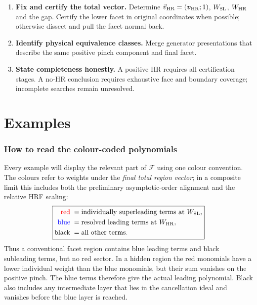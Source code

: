 \documentclass[a4paper,11pt]{article}
\newcommand{\HR}{\mathrm{HR}}
\newcommand{\WSL}{W_{\rm SL}}
\newcommand{\WHR}{W_{\rm HR}}
\newcommand{\vHR}{\vec v_{\rm HR}}
\newcommand{\SLcolour}[1]{{\color{red}#1}}
\newcommand{\HRcolour}[1]{{\color{blue}#1}}
\newcommand{\Othercolour}[1]{{\color{black}#1}}
\begin{document}
\begin{enumerate}[label=\textbf{\arabic*.},leftmargin=*]
      the actual \(\delta\)-weight lattice to find the first nonvanishing
      layer.
\item \textbf{Fix and certify the total vector.}
      Determine \(\vHR=(\boldsymbol v_{\HR};1)\), \(\WSL\), \(\WHR\) and the
      gap.  Certify the lower facet in original coordinates when possible;
      otherwise dissect and pull the facet normal back.
\item \textbf{Identify physical equivalence classes.}
      Merge generator presentations that describe the same positive pinch
      component and final facet.
\item \textbf{State completeness honestly.}
      A positive HR requires all certification stages.  A no-HR conclusion
      requires exhaustive face and boundary coverage; incomplete searches
      remain unresolved.
\end{enumerate}

\part{Examples}

\section{How to read the colour-coded polynomials}
\label{sec:example-colours}

Every example will display the relevant part of \(\mathcal F\) using one
colour convention.  The colours refer to weights under the \emph{final total
region vector}; in a composite limit this includes both the preliminary
asymptotic-order alignment and the relative HRF scaling:
\begin{equation}
 \boxed{\begin{aligned}
 \SLcolour{\text{red}}\;&=\text{individually superleading terms at }\WSL,\\
 \HRcolour{\text{blue}}\;&=\text{resolved leading terms at }\WHR,\\
 \Othercolour{\text{black}}\;&=\text{all other terms}.
 \end{aligned}}
\label{eq:colour-key}
\end{equation}
Thus a conventional facet region contains blue leading terms and black
subleading terms, but no red sector.  In a hidden region the red monomials
have a lower individual weight than the blue monomials, but their sum
vanishes on the positive pinch.  The blue terms therefore give the actual
leading polynomial.  Black also includes any intermediate layer that lies
in the cancellation ideal and vanishes before the blue layer is reached.
\end{document}
